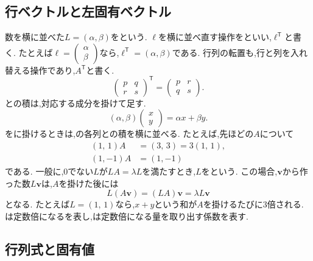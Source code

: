 \subsection{行ベクトルと左固有ベクトル}

数を横に並べた$L=(\alpha,\beta)$を\textbf{}という.
$\boldsymbol{\ell}$を横に並べ直す操作を\textbf{}といい,$\boldsymbol{\ell}^{\mathsf T}$と書く.
たとえば$\boldsymbol{\ell}=\begin{pmatrix}\alpha\\\beta\end{pmatrix}$なら,$\boldsymbol{\ell}^{\mathsf T}=(\alpha,\beta)$である.
行列の転置も,行と列を入れ替える操作であり,$A^{\mathsf T}$と書く.
\[
  \begin{pmatrix}p&q\\r&s\end{pmatrix}^{\mathsf T}
  =\begin{pmatrix}p&r\\q&s\end{pmatrix}.
\]
との積は,対応する成分を掛けて足す.
\[
  (\alpha,\beta)\begin{pmatrix}x\\y\end{pmatrix}
  =\alpha x+\beta y.
\]
をに掛けるときは,の各列との積を横に並べる.
たとえば,先ほどの$A$について
\[
  \begin{aligned}
    (1,\,1)A&=(3,\,3)=3(1,\,1),\\
    (1,-1)A&=(1,-1)
  \end{aligned}
\]
である.
一般に,0でない$L$が$LA=\lambda L$を満たすとき,$L$を\textbf{}という.
この場合,$\boldsymbol{v}$から作った数$L\boldsymbol{v}$は,$A$を掛けた後には
\[
  L(A\boldsymbol{v})=(LA)\boldsymbol{v}
  =\lambda L\boldsymbol{v}
\]
となる.
たとえば$L=(1,\,1)$なら,$x+y$という和が$A$を掛けるたびに$3$倍される.
は定数倍になるを表し,は定数倍になる量を取り出す係数を表す.

\subsection{行列式と固有値}

